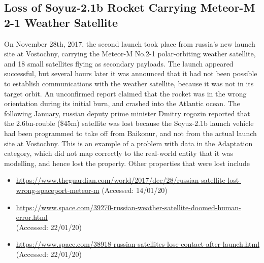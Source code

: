 \subsection{Loss of Soyuz-2.1b Rocket Carrying Meteor-M 2-1 Weather Satellite} \label{bkm:incacc:soyuz}
On November 28th, 2017, the second launch took place from russia's new launch site at Vostochny, carrying the Meteor-M No.2-1 polar-orbiting weather satellite, and 18 small satellites flying as secondary payloads. The launch appeared successful, but several hours later it was announced that it had not been possible to establish communications with the weather satellite, because it was not in its target orbit. An unconfirmed report claimed that the rocket was in the wrong orientation during its initial burn, and crashed into the Atlantic ocean.
The following January, russian deputy prime minister Dmitry rogozin reported that the 2.6bn-rouble (\$45m) satellite was lost because the Soyuz-2.1b launch vehicle had been programmed to take off from Baikonur, and not from the actual launch site at Vostochny. 
This is an example of a problem with data in the Adaptation category, which did not map correctly to the real-world entity that it was modelling, and hence lost the  property. Other properties that were lost include 

\begin{itemize}
  \item \raggedright{\href{https://www.theguardian.com/world/2017/dec/28/russian-satellite-lost-wrong-spaceport-meteor-m}{https://www.theguardian.com/world/2017/dec/28/russian-satellite-lost-wrong-spaceport-meteor-m} (Accessed: 14/01/20)}
  \item \raggedright{\href{https://www.space.com/39270-russian-weather-satellite-doomed-human-error.html}{https://www.space.com/39270-russian-weather-satellite-doomed-human-error.html} \\(Accessed: 22/01/20)}
  \item \raggedright{\href{https://www.space.com/38918-russian-satellites-lose-contact-after-launch.html}{https://www.space.com/38918-russian-satellites-lose-contact-after-launch.html} \\(Accessed: 22/01/20)}
\end{itemize}
%
%
